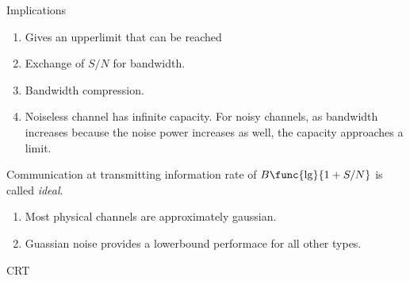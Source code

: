 Implications 
\begin{enumerate}
    \item Gives an upperlimit that can be reached
    \item Exchange of \(S/N\) for bandwidth.
    \item Bandwidth compression.
    \item Noiseless channel has infinite capacity. For noisy channels, as bandwidth increases because the noise power increases as well, the capacity approaches a limit.
\end{enumerate}

Communication at transmitting information rate of \(B \func{\lg}{1 + S/N}\) is called \textit{ideal}.
\begin{enumerate}
    \item Most physical channels are approximately gaussian.
    \item Guassian noise provides a lowerbound performace for all other types.
\end{enumerate}
\begin{remark}
    CRT
\end{remark}